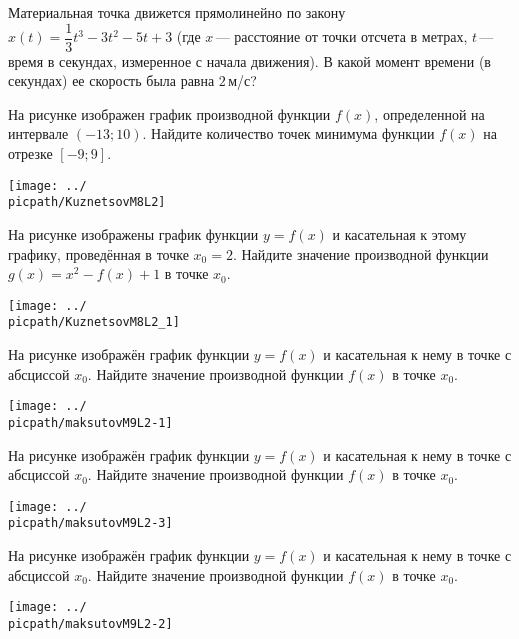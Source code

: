 \begin{class}[number=2]
\begin{listofex}
		\item Материальная точка движется прямолинейно по закону \(x(t)=\dfrac{ 1 }{ 3 }t^3-3t^2-5t+3\) (где \(x\) --- расстояние от точки отсчета в метрах, \(t\) --- время в секундах, измеренное с начала движения). В какой момент времени (в секундах) ее скорость была равна \(2\) м/с?
		\item На рисунке изображен график производной функции \( f(x) \), определенной на интервале \( (-13; 10) \). Найдите количество точек минимума функции \( f(x) \) на отрезке \( [-9;9] \).
		\begin{center}
			\texttt{[image: ../\\picpath/KuznetsovM8L2]}
		\end{center}
		\item 
		\begin{minipage}[t]{0.45\linewidth}
			На рисунке изображены график функции \( y=f(x) \) и касательная к этому графику, проведённая в точке \( x_0=2 \). Найдите значение производной функции \( g(x)=x^2-f(x)+1 \) в точке \( x_0 \).
		\end{minipage}
		\begin{minipage}[t]{0.5\linewidth}
			\texttt{[image: ../\\picpath/KuznetsovM8L2\_1]}
		\end{minipage}
		\item
		\begin{minipage}[t]{0.45\linewidth}
			На рисунке изображён график функции \(y=f(x)\) и касательная к нему в точке с абсциссой \(x_0\). Найдите значение производной функции \(f(x)\) в точке \(x_0\).
		\end{minipage}
		\hspace{0.02\linewidth}
		\begin{minipage}[t]{0.5\linewidth}
			\texttt{[image: ../\\picpath/maksutovM9L2-1]}
		\end{minipage}
		\item
		\begin{minipage}[t]{0.45\linewidth}
			На рисунке изображён график функции \(y=f(x)\) и касательная к нему в точке с абсциссой \(x_0\). Найдите значение производной функции \(f(x)\) в точке \(x_0\).
		\end{minipage}
		\hspace{0.02\linewidth}
		\begin{minipage}[t]{0.5\linewidth}
			\texttt{[image: ../\\picpath/maksutovM9L2-3]}
		\end{minipage}
		\item
		\begin{minipage}[t]{0.45\linewidth}
			На рисунке изображён график функции \(y=f(x)\) и касательная к нему в точке с абсциссой \(x_0\). Найдите значение производной функции \(f(x)\) в точке \(x_0\).
		\end{minipage}
		\hspace{0.02\linewidth}
		\begin{minipage}[t]{0.5\linewidth}
			\texttt{[image: ../\\picpath/maksutovM9L2-2]}
		\end{minipage}
		

\end{listofex}
\end{class}
